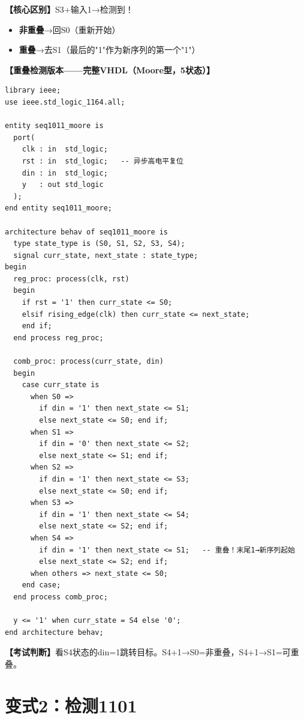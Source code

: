 \begin{detailbox}[完整教学]
\textbf{【核心区别】}S3+输入1→检测到！
\begin{itemize}
  \item \textbf{非重叠}→回S0（重新开始）
  \item \textbf{重叠}→去S1（最后的"1"作为新序列的第一个"1"）
\end{itemize}

\textbf{【重叠检测版本——完整VHDL（Moore型，5状态）】}
\begin{lstlisting}[caption={1011序列检测器——Moore型可重叠}]
library ieee;
use ieee.std_logic_1164.all;

entity seq1011_moore is
  port(
    clk : in  std_logic;
    rst : in  std_logic;   -- 异步高电平复位
    din : in  std_logic;
    y   : out std_logic
  );
end entity seq1011_moore;

architecture behav of seq1011_moore is
  type state_type is (S0, S1, S2, S3, S4);
  signal curr_state, next_state : state_type;
begin
  reg_proc: process(clk, rst)
  begin
    if rst = '1' then curr_state <= S0;
    elsif rising_edge(clk) then curr_state <= next_state;
    end if;
  end process reg_proc;

  comb_proc: process(curr_state, din)
  begin
    case curr_state is
      when S0 =>
        if din = '1' then next_state <= S1;
        else next_state <= S0; end if;
      when S1 =>
        if din = '0' then next_state <= S2;
        else next_state <= S1; end if;
      when S2 =>
        if din = '1' then next_state <= S3;
        else next_state <= S0; end if;
      when S3 =>
        if din = '1' then next_state <= S4;
        else next_state <= S2; end if;
      when S4 =>
        if din = '1' then next_state <= S1;   -- 重叠！末尾1→新序列起始
        else next_state <= S2; end if;
      when others => next_state <= S0;
    end case;
  end process comb_proc;

  y <= '1' when curr_state = S4 else '0';
end architecture behav;
\end{lstlisting}

\textbf{【考试判断】}看S4状态的din=1跳转目标。S4+1→S0=非重叠，S4+1→S1=可重叠。
\end{detailbox}


\section{变式2：检测1101}


